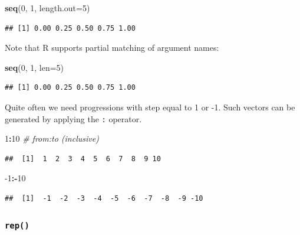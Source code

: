\documentclass[10pt,b5paper,krantz1]{krantz}
\newenvironment{Shaded}{\begin{snugshade}}{\end{snugshade}}
\newcommand{\CommentTok}[1]{\textcolor[rgb]{0.37,0.37,0.37}{\textit{#1}}}
\newcommand{\DataTypeTok}[1]{\textcolor[rgb]{0.27,0.27,0.27}{#1}}
\newcommand{\DecValTok}[1]{\textcolor[rgb]{0.06,0.06,0.06}{#1}}
\newcommand{\KeywordTok}[1]{\textcolor[rgb]{0.27,0.27,0.27}{\textbf{#1}}}
\newcommand{\NormalTok}[1]{#1}
\newcommand{\OperatorTok}[1]{\textcolor[rgb]{0.43,0.43,0.43}{\textbf{#1}}}
\begin{document}
\begin{Shaded}
\begin{Highlighting}[]
\KeywordTok{seq}\NormalTok{(}\DecValTok{0}\NormalTok{, }\DecValTok{1}\NormalTok{, }\DataTypeTok{length.out=}\DecValTok{5}\NormalTok{)}
\end{Highlighting}
\end{Shaded}

\begin{verbatim}
## [1] 0.00 0.25 0.50 0.75 1.00
\end{verbatim}

Note that R supports partial matching of argument names:

\begin{Shaded}
\begin{Highlighting}[]
\KeywordTok{seq}\NormalTok{(}\DecValTok{0}\NormalTok{, }\DecValTok{1}\NormalTok{, }\DataTypeTok{len=}\DecValTok{5}\NormalTok{)}
\end{Highlighting}
\end{Shaded}

\begin{verbatim}
## [1] 0.00 0.25 0.50 0.75 1.00
\end{verbatim}

Quite often we need progressions with step equal to 1 or -1.
Such vectors can be generated by applying the \texttt{:} operator.

\begin{Shaded}
\begin{Highlighting}[]
\DecValTok{1}\OperatorTok{:}\DecValTok{10}     \CommentTok{# from:to (inclusive)}
\end{Highlighting}
\end{Shaded}

\begin{verbatim}
##  [1]  1  2  3  4  5  6  7  8  9 10
\end{verbatim}

\begin{Shaded}
\begin{Highlighting}[]
\DecValTok{-1}\OperatorTok{:-}\DecValTok{10}
\end{Highlighting}
\end{Shaded}

\begin{verbatim}
##  [1]  -1  -2  -3  -4  -5  -6  -7  -8  -9 -10
\end{verbatim}

\hypertarget{rep}{%
\subsubsection{\texorpdfstring{\texttt{rep()}}{rep()}}\label{rep}}
\end{document}
